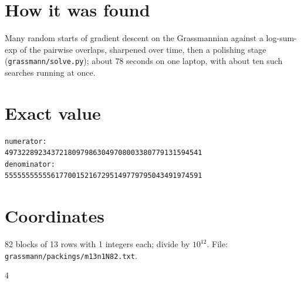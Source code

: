 \documentclass[11pt,a4paper]{article}
\begin{document}
\section{How it was found}
Many random starts of gradient descent on the Grassmannian against a log-sum-exp of the pairwise overlaps, sharpened over time, then a polishing stage (\texttt{grassmann/solve.py}); about 78 seconds on one laptop, with about ten such searches running at once.


\appendix
\section{Exact value}
{\small
\begin{verbatim}
numerator:
49732289234372180979863049708003380779131594541
denominator:
55555555555617700152167295149779795043491974591
\end{verbatim}}

\section{Coordinates}
82 blocks of 13 rows with 1 integers each; divide by $10^{12}$. File: \texttt{grassmann/packings/m13n1N82.txt}.
{\tiny
\begin{multicols}{4}
\end{multicols}}
\end{document}

